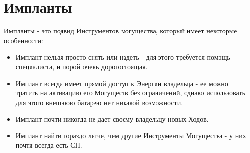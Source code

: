 \section{Импланты}
Импланты - это подвид Инструментов могущества, который имеет некоторые особенности:
\begin{itemize}
\item Имплант нельзя просто снять или надеть - для этого требуется помощь специалиста, и порой очень дорогостоящая.
\item Имплант всегда имеет прямой доступ к Энергии владельца - ее можно тратить на активацию его Могуществ без ограничений, однако использовать для этого внешнюю батарею нет никакой возможности.
\item Имплант почти никогда не дает своему владельцу новых Ходов.
\item Имплант найти гораздо легче, чем другие Инструменты Могущества - у них почти всегда есть СП.
\end{itemize}

